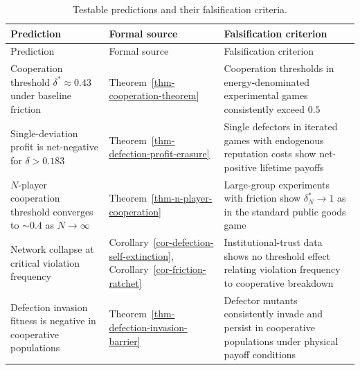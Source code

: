 \documentclass[11pt]{article}
\theoremstyle{plain}
\theoremstyle{definition}
\theoremstyle{remark}
\begin{document}
\begin{longtable}[]{@{}
  >{\raggedright\arraybackslash}p{}
  >{\raggedright\arraybackslash}p{}
  >{\raggedright\arraybackslash}p{}@{}}
\caption{Testable predictions and their falsification
criteria.}\tabularnewline
\toprule\noalign{}
\begin{minipage}[b]{\linewidth}\raggedright
Prediction
\end{minipage} & \begin{minipage}[b]{\linewidth}\raggedright
Formal source
\end{minipage} & \begin{minipage}[b]{\linewidth}\raggedright
Falsification criterion
\end{minipage} \\
\midrule\noalign{}
\endfirsthead
\toprule\noalign{}
\begin{minipage}[b]{\linewidth}\raggedright
Prediction
\end{minipage} & \begin{minipage}[b]{\linewidth}\raggedright
Formal source
\end{minipage} & \begin{minipage}[b]{\linewidth}\raggedright
Falsification criterion
\end{minipage} \\
\midrule\noalign{}
\endhead
\bottomrule\noalign{}
\endlastfoot
Cooperation threshold \(\delta^* \approx 0.43\) under baseline friction
& Theorem~\ref{thm-cooperation-theorem} & Cooperation thresholds in
energy-denominated experimental games consistently exceed \(0.5\) \\
Single-deviation profit is net-negative for \(\delta > 0.183\) &
Theorem~\ref{thm-defection-profit-erasure} & Single defectors in
iterated games with endogenous reputation costs show net-positive
lifetime payoffs \\
\(N\)-player cooperation threshold converges to \(\sim 0.4\) as
\(N \to \infty\) & Theorem~\ref{thm-n-player-cooperation} & Large-group
experiments with friction show \(\delta_N^* \to 1\) as in the standard
public goods game \\
Network collapse at critical violation frequency &
Corollary~\ref{cor-defection-self-extinction},
Corollary~\ref{cor-friction-ratchet} & Institutional-trust data shows no
threshold effect relating violation frequency to cooperative
breakdown \\
Defection invasion fitness is negative in cooperative populations &
Theorem~\ref{thm-defection-invasion-barrier} & Defector mutants
consistently invade and persist in cooperative populations under
physical payoff conditions \\
\end{longtable}
\end{document}
